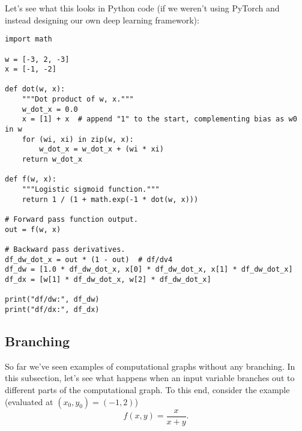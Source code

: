 Let's see what this looks in Python code (if we weren't using PyTorch and instead designing our own deep learning framework):
\begin{lstlisting}
import math

w = [-3, 2, -3]
x = [-1, -2]

def dot(w, x):
    """Dot product of w, x."""
    w_dot_x = 0.0
    x = [1] + x  # append "1" to the start, complementing bias as w0 in w
    for (wi, xi) in zip(w, x):
        w_dot_x = w_dot_x + (wi * xi) 
    return w_dot_x

def f(w, x):
    """Logistic sigmoid function."""
    return 1 / (1 + math.exp(-1 * dot(w, x)))

# Forward pass function output.
out = f(w, x)

# Backward pass derivatives.
df_dw_dot_x = out * (1 - out)  # df/dv4
df_dw = [1.0 * df_dw_dot_x, x[0] * df_dw_dot_x, x[1] * df_dw_dot_x]
df_dx = [w[1] * df_dw_dot_x, w[2] * df_dw_dot_x]

print("df/dw:", df_dw)
print("df/dx:", df_dx)
\end{lstlisting}

\subsection{Branching}
\label{sec:3.3}

So far we've seen examples of computational graphs without any branching. In this subsection, let's see what happens when an input variable branches out to different parts of the computational graph. To this end, consider the example (evaluated at $(x_0, y_0) = (-1, 2)$)
$$
f(x, y) = \frac{x}{x+y}.
$$


